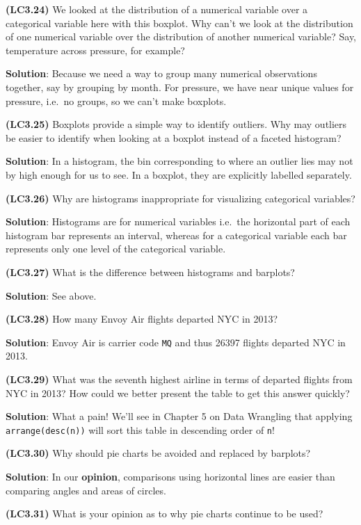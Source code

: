 \documentclass[12pt,]{krantz}
\begin{document}
\textbf{(LC3.24)} We looked at the distribution of a numerical variable
over a categorical variable here with this boxplot. Why can't we look at
the distribution of one numerical variable over the distribution of
another numerical variable? Say, temperature across pressure, for
example?

\textbf{Solution}: Because we need a way to group many numerical
observations together, say by grouping by month. For pressure, we have
near unique values for pressure, i.e.~no groups, so we can't make
boxplots.

\textbf{(LC3.25)} Boxplots provide a simple way to identify outliers.
Why may outliers be easier to identify when looking at a boxplot instead
of a faceted histogram?

\textbf{Solution}: In a histogram, the bin corresponding to where an
outlier lies may not by high enough for us to see. In a boxplot, they
are explicitly labelled separately.

\textbf{(LC3.26)} Why are histograms inappropriate for visualizing
categorical variables?

\textbf{Solution}: Histograms are for numerical variables i.e.~the
horizontal part of each histogram bar represents an interval, whereas
for a categorical variable each bar represents only one level of the
categorical variable.

\textbf{(LC3.27)} What is the difference between histograms and
barplots?

\textbf{Solution}: See above.

\textbf{(LC3.28)} How many Envoy Air flights departed NYC in 2013?

\textbf{Solution}: Envoy Air is carrier code \texttt{MQ} and thus 26397
flights departed NYC in 2013.

\textbf{(LC3.29)} What was the seventh highest airline in terms of
departed flights from NYC in 2013? How could we better present the table
to get this answer quickly?

\textbf{Solution}: What a pain! We'll see in Chapter 5 on Data Wrangling
that applying \texttt{arrange(desc(n))} will sort this table in
descending order of \texttt{n}!

\textbf{(LC3.30)} Why should pie charts be avoided and replaced by
barplots?

\textbf{Solution}: In our \textbf{opinion}, comparisons using horizontal
lines are easier than comparing angles and areas of circles.

\textbf{(LC3.31)} What is your opinion as to why pie charts continue to
be used?
\end{document}
